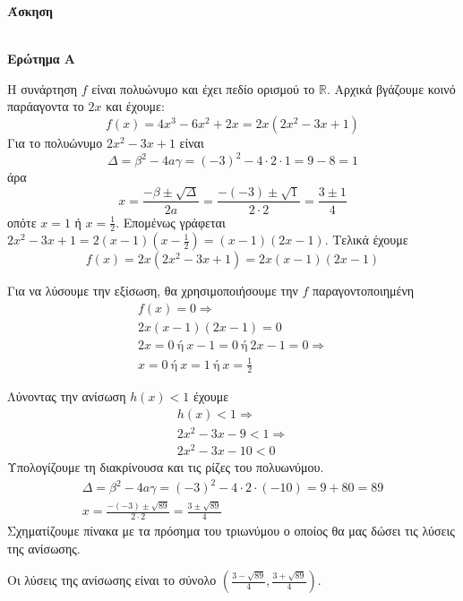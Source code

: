 \documentclass[11pt,a4paper]{article}
\newcommand{\kerkissans}[1]{{\fontfamily{maksf}\selectfont \textbf{#1}}}
\newcounter{askhsh}
\newcommand{\askhsh}{\kerkissans{\large Άσκηση \theaskhsh}\ \addtocounter{askhsh}{1}}
\begin{document}
\askhsh\\
\textbf{Ερώτημα Α}
\begin{rlist}
\item Η συνάρτηση $f$ είναι πολυώνυμο και έχει πεδίο ορισμού το $\mathbb{R}$. Αρχικά βγάζουμε κοινό παράαγοντα το $2x$ και έχουμε:
\[f(x)=4x^3-6x^2+2x=2x\left(2x^2-3x+1\right)\]
Για το πολυώνυμο $2x^2-3x+1$ είναι
\[ \varDelta=\beta^2-4a\gamma=(-3)^2-4\cdot 2\cdot 1=9-8=1 \]
άρα
\[ x=\frac{-\beta\pm\sqrt{\varDelta}}{2a}=\frac{-(-3)\pm\sqrt{1}}{2\cdot 2}=\frac{3\pm 1}{4} \]
οπότε $x=1$ ή $x=\frac{1}{2}$. Επομένως γράφεται $2x^2-3x+1=2(x-1)\left(x-\frac{1}{2}\right)=(x-1)(2x-1)$. Τελικά έχουμε
\[ f(x)=2x\left(2x^2-3x+1\right)=2x(x-1)(2x-1) \]
\item Για να λύσουμε την εξίσωση, θα χρησιμοποιήσουμε την $f$ παραγοντοποιημένη
\begin{gather*}
f(x)=0\Rightarrow\\
2x(x-1)(2x-1)=0\\
2x=0\ \text{ή}\ x-1=0\ \text{ή}\ 2x-1=0\Rightarrow\\
x=0\ \text{ή}\ x=1\ \text{ή}\ x=\frac{1}{2}
\end{gather*}
\item Λύνοντας την ανίσωση $h(x)<1$ έχουμε
\begin{gather*}
h(x)<1\Rightarrow\\
2x^2-3x-9<1\Rightarrow\\
2x^2-3x-10<0
\end{gather*}
Υπολογίζουμε τη διακρίνουσα και τις ρίζες του πολυωνύμου.
\begin{gather*}
\varDelta=\beta^2-4a\gamma=(-3)^2-4\cdot 2\cdot(-10)=9+80=89\\
x=\frac{-(-3)\pm\sqrt{89}}{2\cdot 2}=\frac{3\pm \sqrt{89}}{4}
\end{gather*}
Σχηματίζουμε πίνακα με τα πρόσημα του τριωνύμου ο οποίος θα μας δώσει τις λύσεις της ανίσωσης.
\begin{center}
\end{center}
Οι λύσεις της ανίσωσης είναι το σύνολο $\left(\frac{3-\sqrt{89}}{4},\frac{3+\sqrt{89}}{4}\right)$.
\end{rlist}
\end{document}

